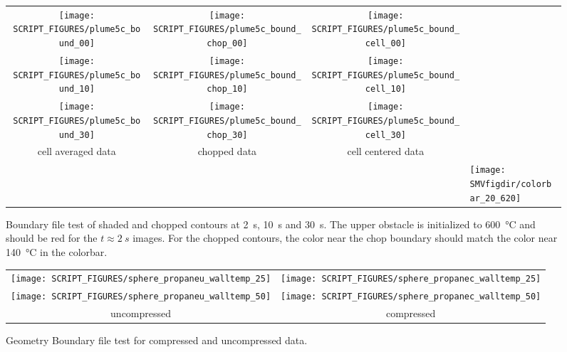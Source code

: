 \documentclass[11pt,twoside]{book}
\begin{document}
\begin{figure}[bph]
\begin{center}
\begin{tabular}{cccl}
\texttt{[image: SCRIPT\_FIGURES/plume5c\_bound\_00]} &
 \texttt{[image: SCRIPT\_FIGURES/plume5c\_bound\_chop\_00]} &
 \texttt{[image: SCRIPT\_FIGURES/plume5c\_bound\_cell\_00]}\\
 \texttt{[image: SCRIPT\_FIGURES/plume5c\_bound\_10]}&
 \texttt{[image: SCRIPT\_FIGURES/plume5c\_bound\_chop\_10]}&
 \texttt{[image: SCRIPT\_FIGURES/plume5c\_bound\_cell\_10]}\\
 \texttt{[image: SCRIPT\_FIGURES/plume5c\_bound\_30]}&
 \texttt{[image: SCRIPT\_FIGURES/plume5c\_bound\_chop\_30]}&
 \texttt{[image: SCRIPT\_FIGURES/plume5c\_bound\_cell\_30]}\\
cell averaged  data&chopped data&cell centered data\\
 &&&\raisebox{0.0in}[0pt]{\texttt{[image: \\SMVfigdir/colorbar\_20\_620]}}\\
  \end{tabular}
\end{center}
\caption[Boundary file test of shaded and chopped
contours]{Boundary file test of shaded and chopped contours at
\SI{2}{s}, \SI{10}{s} and \SI{30}{s}. The
upper obstacle is initialized to \SI{600}{\degreeCelsius} and should be red
for the $t\approx\SI{2}{s}$ images. For the chopped contours, the
color near the chop boundary should match the color near
\SI{140}{\degreeCelsius} in the colorbar.}
\label{figboundtest}%
\end{figure}

\begin{figure}[bph]
\begin{center}
\begin{tabular}{cc}
 \texttt{[image: SCRIPT\_FIGURES/sphere\_propaneu\_walltemp\_25]} &
 \texttt{[image: SCRIPT\_FIGURES/sphere\_propanec\_walltemp\_25]}\\
 \texttt{[image: SCRIPT\_FIGURES/sphere\_propaneu\_walltemp\_50]} &
 \texttt{[image: SCRIPT\_FIGURES/sphere\_propanec\_walltemp\_50]}\\
 uncompressed&compressed\\
\end{tabular}
\end{center}
\caption[Geometry Boundary file test for compressed and uncompressed data.]
{Geometry Boundary file test for compressed and uncompressed data.}
\label{figgeomboundtest}%
\end{figure}
\end{document}
